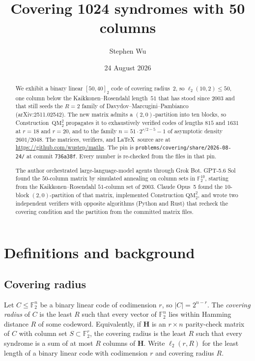 \documentclass[11pt,a4paper]{article}
\title{Covering 1024 syndromes with 50 columns}
\author{Stephen Wu}
\date{24 August 2026}
\newcommand{\FF}{\mathbb{F}}
\newcommand{\HH}{\boldsymbol{H}}
\newcommand{\ellr}{\ell_2}
\begin{document}
\maketitle

\begin{abstract}
We exhibit a binary linear $[50,40]_2$ code of covering radius~$2$, so
$\ellr(10,2)\le 50$, one column below the Kaikkonen--Rosendahl
length~$51$ that has stood since 2003 and that still seeds the $R=2$
family of Davydov--Marcugini--Pambianco (arXiv:2511.02542). The new
matrix admits a $(2,0)$-partition into ten blocks, so
Construction~$\mathrm{QM}_2^2$ propagates it to exhaustively verified
codes of lengths $815$ and $1631$ at $r=18$ and $r=20$, and to the
family $n=51\cdot 2^{r/2-5}-1$ of asymptotic density $2601/2048$.
The matrices, verifiers, and \LaTeX\ source are at
\url{https://github.com/wustep/maths}. The pin is
\texttt{problems/covering/share/2026-08-24/} at commit
\texttt{736a38f}. Every number is re-checked from the files in that pin.
\end{abstract}

\begingroup
\renewcommand{\abstractname}{Computation}
\begin{abstract}
The author orchestrated large-language-model agents through Grok Bot.
GPT-5.6 Sol found the $50$-column matrix by simulated annealing on
column sets in $\FF_2^{10}$, starting from the Kaikkonen--Rosendahl
$51$-column set of 2003. Claude Opus~5 found the $10$-block
$(2,0)$-partition of that matrix, implemented Construction
$\mathrm{QM}_2^2$, and wrote two independent verifiers with opposite
algorithms (Python and Rust) that recheck the covering condition and
the partition from the committed matrix files.
\end{abstract}
\endgroup

\section{Definitions and background}

\subsection{Covering radius}

Let $C\le\FF_2^n$ be a binary linear code of codimension $r$, so
$\lvert C\rvert=2^{n-r}$. The \emph{covering radius} of $C$ is the least
$R$ such that every vector of $\FF_2^n$ lies within Hamming distance
$R$ of some codeword. Equivalently, if $\HH$ is an $r\times n$
parity-check matrix of $C$ with column set $S\subset\FF_2^r$, the
covering radius is the least $R$ such that every syndrome is a sum of
at most $R$ columns of $\HH$. Write $\ellr(r,R)$ for the least length
of a binary linear code with codimension $r$ and covering radius $R$.
\end{document}
